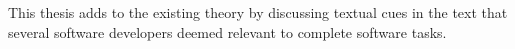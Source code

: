 This thesis adds to the existing theory by discussing 
textual cues in the text that several software developers deemed relevant 
to complete software tasks.  


















